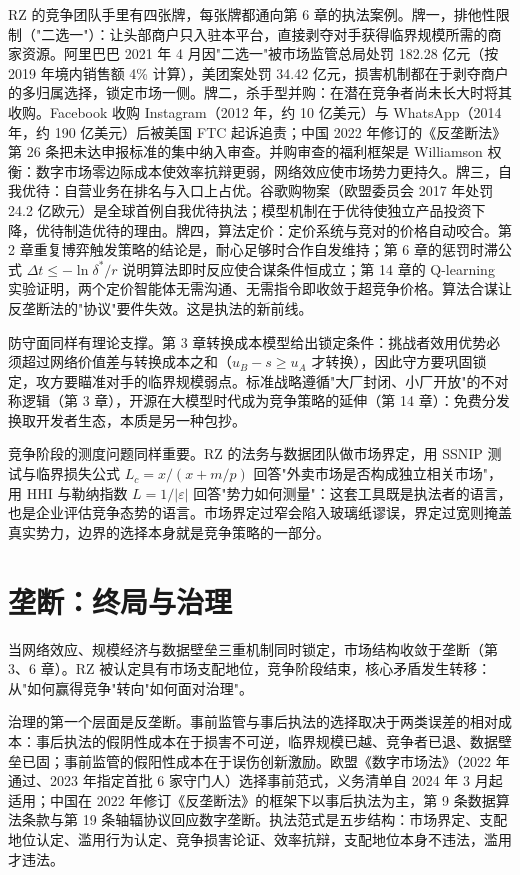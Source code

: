 RZ 的竞争团队手里有四张牌，每张牌都通向第 6 章的执法案例。牌一，排他性限制（"二选一"）：让头部商户只入驻本平台，直接剥夺对手获得临界规模所需的商家资源。阿里巴巴 2021 年 4 月因"二选一"被市场监管总局处罚 182.28 亿元（按 2019 年境内销售额 4\% 计算），美团案处罚 34.42 亿元，损害机制都在于剥夺商户的多归属选择，锁定市场一侧。牌二，杀手型并购：在潜在竞争者尚未长大时将其收购。Facebook 收购 Instagram（2012 年，约 10 亿美元）与 WhatsApp（2014 年，约 190 亿美元）后被美国 FTC 起诉追责；中国 2022 年修订的《反垄断法》第 26 条把未达申报标准的集中纳入审查。并购审查的福利框架是 Williamson 权衡：数字市场零边际成本使效率抗辩更弱，网络效应使市场势力更持久。牌三，自我优待：自营业务在排名与入口上占优。谷歌购物案（欧盟委员会 2017 年处罚 24.2 亿欧元）是全球首例自我优待执法；模型机制在于优待使独立产品投资下降，优待制造优待的理由。牌四，算法定价：定价系统与竞对的价格自动咬合。第 2 章重复博弈触发策略的结论是，耐心足够时合作自发维持；第 6 章的惩罚时滞公式 $\Delta t\leq-\ln\delta^{*}/r$ 说明算法即时反应使合谋条件恒成立；第 14 章的 Q-learning 实验证明，两个定价智能体无需沟通、无需指令即收敛于超竞争价格。算法合谋让反垄断法的"协议"要件失效。这是执法的新前线。

防守面同样有理论支撑。第 3 章转换成本模型给出锁定条件：挑战者效用优势必须超过网络价值差与转换成本之和（$u_B-s\geq u_A$ 才转换），因此守方要巩固锁定，攻方要瞄准对手的临界规模弱点。标准战略遵循"大厂封闭、小厂开放"的不对称逻辑（第 3 章），开源在大模型时代成为竞争策略的延伸（第 14 章）：免费分发换取开发者生态，本质是另一种包抄。

竞争阶段的测度问题同样重要。RZ 的法务与数据团队做市场界定，用 SSNIP 测试与临界损失公式 $L_c=x/(x+m/p)$ 回答"外卖市场是否构成独立相关市场"，用 HHI 与勒纳指数 $L=1/|\varepsilon|$ 回答"势力如何测量"：这套工具既是执法者的语言，也是企业评估竞争态势的语言。市场界定过窄会陷入玻璃纸谬误，界定过宽则掩盖真实势力，边界的选择本身就是竞争策略的一部分。

\section{垄断：终局与治理}

当网络效应、规模经济与数据壁垒三重机制同时锁定，市场结构收敛于垄断（第 3、6 章）。RZ 被认定具有市场支配地位，竞争阶段结束，核心矛盾发生转移：从"如何赢得竞争"转向"如何面对治理"。

治理的第一个层面是反垄断。事前监管与事后执法的选择取决于两类误差的相对成本：事后执法的假阴性成本在于损害不可逆，临界规模已越、竞争者已退、数据壁垒已固；事前监管的假阳性成本在于误伤创新激励。欧盟《数字市场法》（2022 年通过、2023 年指定首批 6 家守门人）选择事前范式，义务清单自 2024 年 3 月起适用；中国在 2022 年修订《反垄断法》的框架下以事后执法为主，第 9 条数据算法条款与第 19 条轴辐协议回应数字垄断。执法范式是五步结构：市场界定、支配地位认定、滥用行为认定、竞争损害论证、效率抗辩，支配地位本身不违法，滥用才违法。

